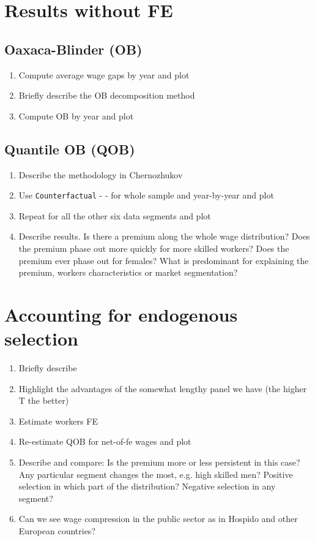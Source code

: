 \documentclass{article}
\begin{document}
\section{Results without FE}
\subsection{Oaxaca-Blinder (OB)}
\begin{enumerate}
    \item Compute average wage gaps by year and plot
    \item Briefly describe the OB decomposition method
    \item Compute OB by year and plot
\end{enumerate}

\subsection{Quantile OB (QOB)}
\begin{enumerate}
    \item Describe the methodology in Chernozhukov 
    \item Use \texttt{Counterfactual} - \cite{chen_counterfactual:_2017} -  for whole sample and year-by-year and plot
    \item Repeat for all the other six data segments and plot
    \item Describe results. Is there a premium along the whole wage distribution? Does the premium phase out more quickly for more skilled workers? Does the premium ever phase out for females? What is predominant for explaining the premium, workers characteristics or market segmentation?
\end{enumerate}

\section{Accounting for endogenous selection}
\begin{enumerate}
    \item Briefly describe \cite{Canay2011} 
    \item Highlight the advantages of the somewhat lengthy panel we have (the higher T the better)
    \item Estimate workers FE
    \item Re-estimate QOB for net-of-fe wages and plot
    \item Describe and compare: Is the premium more or less persistent in this case? Any particular segment changes the most, e.g. high skilled men? Positive selection in which part of the distribution? Negative selection in any segment? 
    \item Can we see wage compression in the public sector as in Hospido and other European countries?
\end{enumerate}
\end{document}

